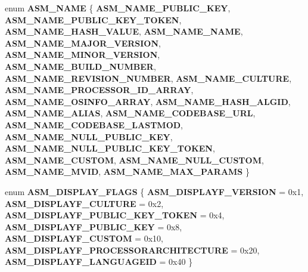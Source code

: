 \begin{DoxyCompactItemize}
\item 
\mbox{\label{interfaceunique_afdaa32bdf64fc09842a023a2d38cef5e}} 
enum {\bfseries A\+S\+M\+\_\+\+N\+A\+ME} \{ \newline
{\bfseries A\+S\+M\+\_\+\+N\+A\+M\+E\+\_\+\+P\+U\+B\+L\+I\+C\+\_\+\+K\+EY}, 
{\bfseries A\+S\+M\+\_\+\+N\+A\+M\+E\+\_\+\+P\+U\+B\+L\+I\+C\+\_\+\+K\+E\+Y\+\_\+\+T\+O\+K\+EN}, 
{\bfseries A\+S\+M\+\_\+\+N\+A\+M\+E\+\_\+\+H\+A\+S\+H\+\_\+\+V\+A\+L\+UE}, 
{\bfseries A\+S\+M\+\_\+\+N\+A\+M\+E\+\_\+\+N\+A\+ME}, 
\newline
{\bfseries A\+S\+M\+\_\+\+N\+A\+M\+E\+\_\+\+M\+A\+J\+O\+R\+\_\+\+V\+E\+R\+S\+I\+ON}, 
{\bfseries A\+S\+M\+\_\+\+N\+A\+M\+E\+\_\+\+M\+I\+N\+O\+R\+\_\+\+V\+E\+R\+S\+I\+ON}, 
{\bfseries A\+S\+M\+\_\+\+N\+A\+M\+E\+\_\+\+B\+U\+I\+L\+D\+\_\+\+N\+U\+M\+B\+ER}, 
{\bfseries A\+S\+M\+\_\+\+N\+A\+M\+E\+\_\+\+R\+E\+V\+I\+S\+I\+O\+N\+\_\+\+N\+U\+M\+B\+ER}, 
\newline
{\bfseries A\+S\+M\+\_\+\+N\+A\+M\+E\+\_\+\+C\+U\+L\+T\+U\+RE}, 
{\bfseries A\+S\+M\+\_\+\+N\+A\+M\+E\+\_\+\+P\+R\+O\+C\+E\+S\+S\+O\+R\+\_\+\+I\+D\+\_\+\+A\+R\+R\+AY}, 
{\bfseries A\+S\+M\+\_\+\+N\+A\+M\+E\+\_\+\+O\+S\+I\+N\+F\+O\+\_\+\+A\+R\+R\+AY}, 
{\bfseries A\+S\+M\+\_\+\+N\+A\+M\+E\+\_\+\+H\+A\+S\+H\+\_\+\+A\+L\+G\+ID}, 
\newline
{\bfseries A\+S\+M\+\_\+\+N\+A\+M\+E\+\_\+\+A\+L\+I\+AS}, 
{\bfseries A\+S\+M\+\_\+\+N\+A\+M\+E\+\_\+\+C\+O\+D\+E\+B\+A\+S\+E\+\_\+\+U\+RL}, 
{\bfseries A\+S\+M\+\_\+\+N\+A\+M\+E\+\_\+\+C\+O\+D\+E\+B\+A\+S\+E\+\_\+\+L\+A\+S\+T\+M\+OD}, 
{\bfseries A\+S\+M\+\_\+\+N\+A\+M\+E\+\_\+\+N\+U\+L\+L\+\_\+\+P\+U\+B\+L\+I\+C\+\_\+\+K\+EY}, 
\newline
{\bfseries A\+S\+M\+\_\+\+N\+A\+M\+E\+\_\+\+N\+U\+L\+L\+\_\+\+P\+U\+B\+L\+I\+C\+\_\+\+K\+E\+Y\+\_\+\+T\+O\+K\+EN}, 
{\bfseries A\+S\+M\+\_\+\+N\+A\+M\+E\+\_\+\+C\+U\+S\+T\+OM}, 
{\bfseries A\+S\+M\+\_\+\+N\+A\+M\+E\+\_\+\+N\+U\+L\+L\+\_\+\+C\+U\+S\+T\+OM}, 
{\bfseries A\+S\+M\+\_\+\+N\+A\+M\+E\+\_\+\+M\+V\+ID}, 
\newline
{\bfseries A\+S\+M\+\_\+\+N\+A\+M\+E\+\_\+\+M\+A\+X\+\_\+\+P\+A\+R\+A\+MS}
 \}
\item 
\mbox{\label{interfaceunique_a7050e343ac6f7c0fd2ef7278396bc014}} 
enum {\bfseries A\+S\+M\+\_\+\+D\+I\+S\+P\+L\+A\+Y\+\_\+\+F\+L\+A\+GS} \{ \newline
{\bfseries A\+S\+M\+\_\+\+D\+I\+S\+P\+L\+A\+Y\+F\+\_\+\+V\+E\+R\+S\+I\+ON} = 0x1, 
{\bfseries A\+S\+M\+\_\+\+D\+I\+S\+P\+L\+A\+Y\+F\+\_\+\+C\+U\+L\+T\+U\+RE} = 0x2, 
{\bfseries A\+S\+M\+\_\+\+D\+I\+S\+P\+L\+A\+Y\+F\+\_\+\+P\+U\+B\+L\+I\+C\+\_\+\+K\+E\+Y\+\_\+\+T\+O\+K\+EN} = 0x4, 
{\bfseries A\+S\+M\+\_\+\+D\+I\+S\+P\+L\+A\+Y\+F\+\_\+\+P\+U\+B\+L\+I\+C\+\_\+\+K\+EY} = 0x8, 
\newline
{\bfseries A\+S\+M\+\_\+\+D\+I\+S\+P\+L\+A\+Y\+F\+\_\+\+C\+U\+S\+T\+OM} = 0x10, 
{\bfseries A\+S\+M\+\_\+\+D\+I\+S\+P\+L\+A\+Y\+F\+\_\+\+P\+R\+O\+C\+E\+S\+S\+O\+R\+A\+R\+C\+H\+I\+T\+E\+C\+T\+U\+RE} = 0x20, 
{\bfseries A\+S\+M\+\_\+\+D\+I\+S\+P\+L\+A\+Y\+F\+\_\+\+L\+A\+N\+G\+U\+A\+G\+E\+ID} = 0x40
 \}
\end{DoxyCompactItemize}
